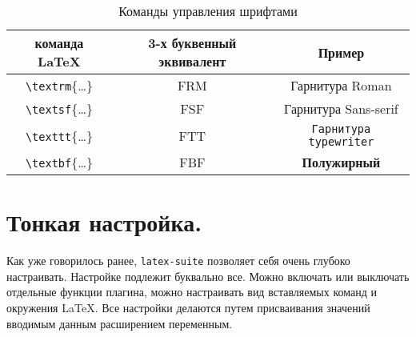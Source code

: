 \documentclass[a4paper]{article}
\begin{document}
			\begin{table}
				\centering
				\begin{tabular}{|c|c|c|}
					\hline
					команда \LaTeX&3-х буквенный эквивалент&Пример\\
					\hline
					\verb|\textrm|\{\ldots\}&FRM&\textrm{Гарнитура Roman}\\
					\verb|\textsf|\{\ldots\}&FSF&\textsf{Гарнитура Sans-serif}\\
					\verb|\texttt|\{\ldots\}&FTT&\texttt{Гарнитура typewriter}\\
					\verb|\textbf|\{\ldots\}&FBF&\textbf{Полужирный}\\
					\hline
				\end{tabular}
				\caption{Команды управления шрифтами}
				\label{tab:fonts}
			\end{table}
\part{Тонкая настройка.}
Как уже говорилось ранее, \texttt{latex-suite} позволяет себя очень глубоко настраивать.
Настройке подлежит буквально все. Можно включать или выключать отдельные функции плагина,
можно настраивать вид вставляемых команд и окружения \LaTeX. Все настройки делаются путем
присваивания значений вводимым данным расширением переменным. 
\end{document}
